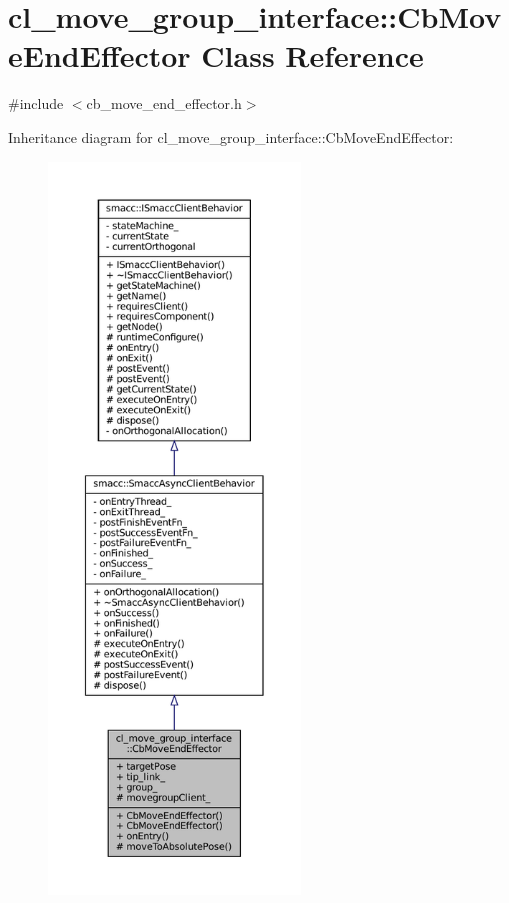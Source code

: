 \hypertarget{classcl__move__group__interface_1_1CbMoveEndEffector}{}\section{cl\+\_\+move\+\_\+group\+\_\+interface\+:\+:Cb\+Move\+End\+Effector Class Reference}
\label{classcl__move__group__interface_1_1CbMoveEndEffector}


{\ttfamily \#include $<$cb\+\_\+move\+\_\+end\+\_\+effector.\+h$>$}



Inheritance diagram for cl\+\_\+move\+\_\+group\+\_\+interface\+:\+:Cb\+Move\+End\+Effector\+:
\nopagebreak
\begin{figure}[H]
\begin{center}
\leavevmode
\includegraphics[height=550pt]{classcl__move__group__interface_1_1CbMoveEndEffector__inherit__graph}
\end{center}
\end{figure}


